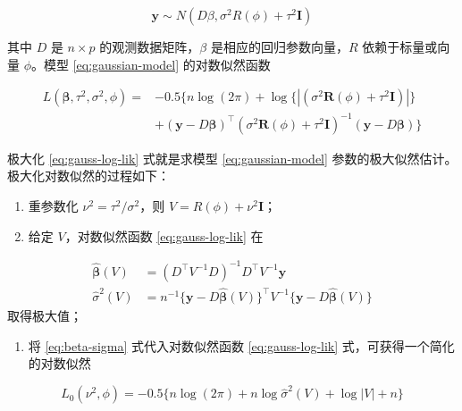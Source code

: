 \documentclass[12pt,a4paper,UTF8,twoside]{book}
\providecommand{\tightlist}{%
  \setlength{\itemsep}{0pt}\setlength{\parskip}{0pt}}
\theoremstyle{definition}
\theoremstyle{definition}
\theoremstyle{definition}
\theoremstyle{remark}
\begin{document}
\begin{equation}
\mathbf{y} \sim N(D\beta,\sigma^2 R(\phi) + \tau^2\mathbf{I})
\label{eq:gaussian-model}
\end{equation}

其中 \(D\) 是 \(n \times p\) 的观测数据矩阵，\(\beta\)
是相应的回归参数向量，\(R\) 依赖于标量或向量 \(\phi\)。模型
\eqref{eq:gaussian-model} 的对数似然函数

\begin{equation}
\begin{aligned}
L(\boldsymbol{\beta},\tau^2,\sigma^2,\phi) = {} 
 & - 0.5\{ n\log(2\pi) + \log\{|(\sigma^2\mathbf{R}(\phi)+\tau^2\mathbf{I})|\} \\
 & + (\mathbf{y} - D\boldsymbol{\beta})^{\top}(\sigma^2\mathbf{R}(\phi)+\tau^2\mathbf{I})^{-1}(\mathbf{y} - D\boldsymbol{\beta}) \}  
\end{aligned} \label{eq:gauss-log-lik}
\end{equation}

极大化 \eqref{eq:gauss-log-lik} 式就是求模型 \eqref{eq:gaussian-model}
参数的极大似然估计。极大化对数似然的过程如下：

\begin{enumerate}
\def\labelenumi{\arabic{enumi}.}
\item
  重参数化 \(\nu^2 = \tau^2/\sigma^2\)，则
  \(V = R(\phi) + \nu^2 \mathbf{I}\)；
\item
  给定 \(V\)，对数似然函数 \eqref{eq:gauss-log-lik} 在
\end{enumerate}

\begin{equation}
  \begin{aligned}
  \hat{\boldsymbol{\beta}}(V) & =  (D^{\top} V^{-1} D)^{-1} D^{\top} V^{-1}\mathbf{y} \\
  \hat{\sigma}^2(V)           & =  n^{-1} \{\mathbf{y} - D\hat{\boldsymbol{\beta}}(V)\}^{\top} V^{-1} \{\mathbf{y} - D\hat{\boldsymbol{\beta}}(V)\}
  \end{aligned} \label{eq:beta-sigma}
  \end{equation} 取得极大值；

\begin{enumerate}
\def\labelenumi{\arabic{enumi}.}
\setcounter{enumi}{2}
\tightlist
\item
  将 \eqref{eq:beta-sigma} 式代入对数似然函数 \eqref{eq:gauss-log-lik}
  式，可获得一个简化的对数似然
\end{enumerate}

\begin{equation}
L_{0}(\nu^2,\phi) = - 0.5\{ n\log(2\pi) + n\log \hat{\sigma}^2(V) + \log |V| + n \}
\label{eq:reduced-gauss-log-lik}
\end{equation}
\end{document}
